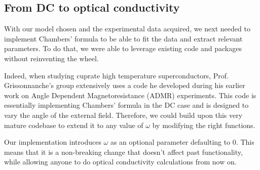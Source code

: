 \subsection{From DC to optical conductivity}
With our model chosen and the experimental data acquired, 
we next needed to implement Chambers' formula to be able to fit the data and extract relevant parameters. 
To do that, we were able to leverage existing code and packages without reinventing the wheel.

Indeed, when studying cuprate high temperature superconductors, 
Prof. Grissonnanche's group extensively uses a code he developed during his earlier work on Angle Dependent Magnetoresistance (ADMR) experiments\cite{grissonnanche2021}. 
This code is essentially implementing Chambers' formula in the DC case and is designed to vary the angle of the external field. 
Therefore, we could build upon this very mature codebase to extend it to any value of $\omega$ by modifying the right functions.

Our implementation introduces $\omega$ as an optional parameter defaulting to $0$. 
This means that it is a non-breaking change that doesn't affect past functionality, 
while allowing anyone to do optical conductivity calculations from now on.